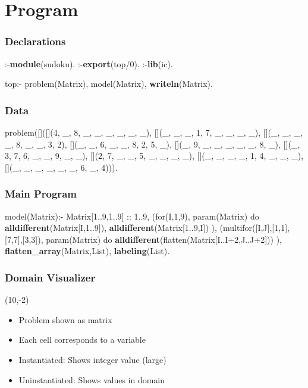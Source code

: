 \documentclass{beamer}
\begin{document}
\section{Program}

\begin{frame}[fragile]
\frametitle{Declarations}
\begin{semiverbatim}
:-{\bf{}module}(sudoku).
:-{\bf{}export}(top/0).
:-{\bf{}lib}(ic).

top:-
    problem(Matrix),
    model(Matrix),
    {\bf{}writeln}(Matrix).
\end{semiverbatim}
\end{frame}

\begin{frame}[fragile]
\frametitle{Data}        
\begin{semiverbatim}
problem([]([](4, _, 8, _, _, _, _, _, _), 
           [](_, _, _, 1, 7, _, _, _, _), 
           [](_, _, _, _, 8, _, _, 3, 2), 
           [](_, _, 6, _, _, 8, 2, 5, _), 
           [](_, 9, _, _, _, _, _, 8, _), 
           [](_, 3, 7, 6, _, _, 9, _, _), 
           [](2, 7, _, _, 5, _, _, _, _), 
           [](_, _, _, _, 1, 4, _, _, _), 
           [](_, _, _, _, _, _, 6, _, 4))).
\end{semiverbatim}
\end{frame}

\begin{frame}[fragile]
\frametitle{Main Program}
\begin{semiverbatim}
model(Matrix):-
    Matrix[1..9,1..9] :: 1..9,
    (for(I,1,9),
     param(Matrix) do
        {\bf{}alldifferent}(Matrix[I,1..9]),
        {\bf{}alldifferent}(Matrix[1..9,I])
    ),
    (multifor([I,J],[1,1],[7,7],[3,3]),
     param(Matrix) do
        {\bf{}alldifferent}(flatten(Matrix[I..I+2,J..J+2]))
    ),
    {\bf{}flatten_array}(Matrix,List),
    {\bf{}labeling}(List).
\end{semiverbatim}
\end{frame}

\begin{frame}
\frametitle{Domain Visualizer}
\begin{textblock}{5.5}(10,-2)
\scalebox{0.68}{}
\end{textblock}
\begin{itemize}
\item Problem shown as matrix
\item Each cell corresponds to a variable
\item Instantiated: Shows integer value (large)
\item Uninstantiated: Shows values in domain
\end{itemize}
\end{frame}
\end{document}
